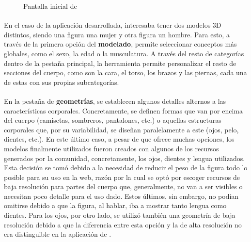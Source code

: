 \documentclass{subfiles}
\begin{document}
    \begin{figure}
    \centering
    \caption{Pantalla inicial de \makehuman}
    \label{fig:makehuman_landing}
    \end{figure}

    \paragraph{}
    En el caso de la aplicación desarrollada, interesaba tener dos modelos 3D distintos, siendo una figura una mujer y otra figura un hombre. Para esto, a través de la primera opción del \textbf{modelado}, \makehuman permite seleccionar conceptos más globales, como el sexo, la edad o la musculatura. A través del resto de categorías dentro de la pestaña principal, la herramienta permite personalizar el resto de secciones del cuerpo, como son la cara, el torso, los brazos y las piernas, cada una de estas con sus propias subcategorías.

    \paragraph{}
    En la pestaña de \textbf{geometrías}, se establecen algunos detalles alternos a las características corporales. Concretamente, se definen formas que van por encima del cuerpo (camisetas, sombreros, pantalones, etc.) o aquellas estructuras corporales que, por su variabilidad, se diseñan paralelamente a este (ojos, pelo, dientes, etc.). En este último caso, a pesar de que \makehuman ofrece muchas opciones, los modelos finalmente utilizados fueron creados con algunos de los recursos generados por la comunidad, concretamente, los ojos, dientes y lengua utilizados. Esta decisión se tomó debido a la necesidad de reducir el peso de la figura todo lo posible para su uso en la web, razón por la cual se optó por escoger recursos de baja resolución para partes del cuerpo que, generalmente, no van a ser visibles o necesitan poco detalle para el uso dado. Estos últimos, sin embargo, no podían omitirse debido a que la figura, al hablar, iba a mostrar tanto lengua como dientes. Para los ojos, por otro lado, se utilizó también una geometría de baja resolución debido a que la diferencia entre esta opción y la de alta resolución no era distinguible en la aplicación de \ra.
\end{document}
